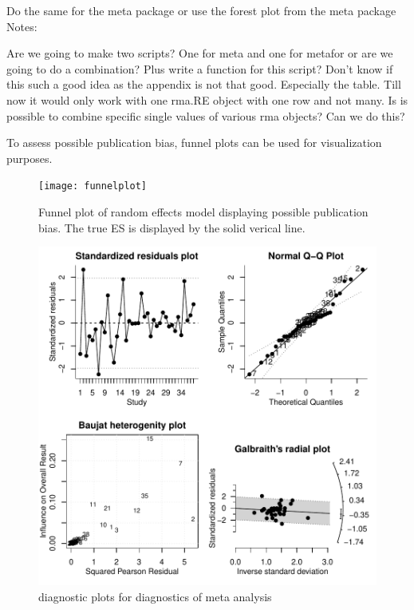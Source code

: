 \documentclass[11pt, a4paper]{article} %
\begin{document}
Do the same for the meta package or use the forest plot from the meta package\\

Notes:

Are we going to make two scripts? One for meta and one for metafor or are we going to do a combination? Plus write a function for this script? 
Don't know if this such a good idea as the appendix is not that good. Especially the table. Till now it would only work with one rma.RE object with one row and not many. Is is possible to combine specific single values of various rma objects? Can we do this?



To assess possible publication bias, funnel plots can be used for visualization purposes.


\begin{figure}
\captionsetup{width=0.6\textwidth}
\centering
\texttt{[image: funnelplot]}
\caption{Funnel plot of random effects model displaying possible publication bias. The true ES is displayed by the solid verical line.}
\end{figure}



\begin{figure}
\captionsetup{width=0.6\textwidth}
\centering
\includegraphics[width=1\textwidth]{sweave_document_TB-diagnostics}
\caption{diagnostic plots for diagnostics of meta analysis}
\label{fig:diagnostics}
\end{figure}
\end{document}
